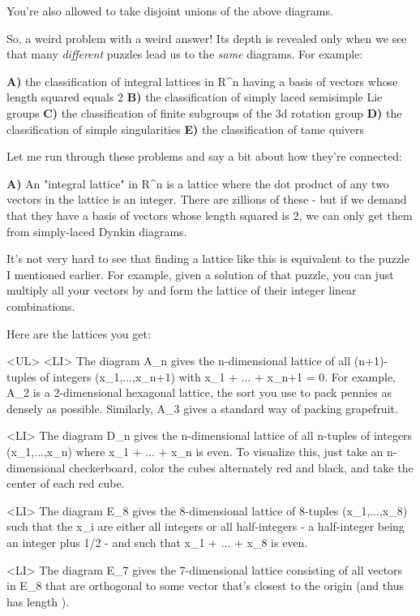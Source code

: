 You're also allowed to take disjoint unions of the above diagrams. 

So, a weird problem with a weird answer!   Its depth is revealed
only when we see that many \emph{different} puzzles lead us to the 
\emph{same}
diagrams.  For example:

\textbf{A)} the classification of integral lattices in R^{n} 
having a basis of vectors whose length squared equals 2
\textbf{B)} the classification of simply laced semisimple Lie groups 
\textbf{C)} the classification of finite subgroups of the 3d rotation group
\textbf{D)} the classification of simple singularities
\textbf{E)} the classification of tame quivers

Let me run through these problems and say a bit about how they're
connected:

\textbf{A)}
An "integral lattice" in R^{n} 
is a lattice where the dot product 
of any two vectors in the lattice is an integer.   There are zillions
of these - but if we demand that they have a basis of vectors whose
length squared is 2, we can only get them from simply-laced Dynkin 
diagrams.

It's not very hard to see that finding a lattice like this is equivalent 
to the puzzle I mentioned earlier.  For example, given a solution of 
that puzzle, you can just multiply all your vectors by  and
form the lattice of their integer linear combinations.  

Here are the lattices you get:

<UL>
<LI>
The diagram A_{n} gives the n-dimensional lattice 
of all (n+1)-tuples of integers (x_{1},...,x_{n+1}) with
x_{1} + ... + x_{n+1} = 0.
For example, A_{2} is a 2-dimensional hexagonal
lattice, the sort you use to pack pennies as densely as
possible.  Similarly, A_{3} gives a standard way of packing 
grapefruit.

<LI>
The diagram D_{n} gives the n-dimensional lattice
of all n-tuples of integers (x_{1},...,x_{n}) where
x_{1} + ... + x_{n} 
is even.
To visualize this, just take an n-dimensional checkerboard,
color the cubes alternately red and black, and take the center of
each red cube.  

<LI>
The diagram E_{8} gives the 8-dimensional lattice of
8-tuples (x_{1},...,x_{8}) such
that the x_{i} are either all integers or all half-integers - a
half-integer being an integer plus 1/2 - and such that
x_{1} + ... + x_{8} 
is even.

<LI>
The diagram E_{7} gives the 7-dimensional lattice consisting
of all vectors in E_{8} that are orthogonal to some vector
that's closest to the origin (and thus has length ).

